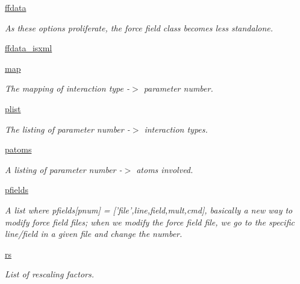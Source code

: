 \begin{DoxyCompactItemize}
\item 
\hyperlink{classforcebalance_1_1forcefield_1_1FF_a70d7c27557dcefd0ae66a1f1cc4ec211}{ffdata}
\begin{DoxyCompactList}\small\item\em \-As these options proliferate, the force field class becomes less standalone. \end{DoxyCompactList}\item 
\hyperlink{classforcebalance_1_1forcefield_1_1FF_a4a535d76727fdde57c562d41715b6620}{ffdata\-\_\-isxml}
\item 
\hyperlink{classforcebalance_1_1forcefield_1_1FF_a0b4c59bcf7ecb19000b3a173151a7c5b}{map}
\begin{DoxyCompactList}\small\item\em \-The mapping of interaction type -\/$>$ parameter number. \end{DoxyCompactList}\item 
\hyperlink{classforcebalance_1_1forcefield_1_1FF_a2d12bd53577f14af5e8d4b64ebb6281f}{plist}
\begin{DoxyCompactList}\small\item\em \-The listing of parameter number -\/$>$ interaction types. \end{DoxyCompactList}\item 
\hyperlink{classforcebalance_1_1forcefield_1_1FF_a18d57dc6664451e586f0b5e992fb7873}{patoms}
\begin{DoxyCompactList}\small\item\em \-A listing of parameter number -\/$>$ atoms involved. \end{DoxyCompactList}\item 
\hyperlink{classforcebalance_1_1forcefield_1_1FF_aa521223f43f9629b30384491cafbd10c}{pfields}
\begin{DoxyCompactList}\small\item\em \-A list where pfields\mbox{[}pnum\mbox{]} = \mbox{[}'file',line,field,mult,cmd\mbox{]}, basically a new way to modify force field files; when we modify the force field file, we go to the specific line/field in a given file and change the number. \end{DoxyCompactList}\item 
\hyperlink{classforcebalance_1_1forcefield_1_1FF_a3424d0271d9eebf1962ad87286ec9fc3}{rs}
\begin{DoxyCompactList}\small\item\em \-List of rescaling factors. \end{DoxyCompactList}\item 

\end{DoxyCompactItemize}

